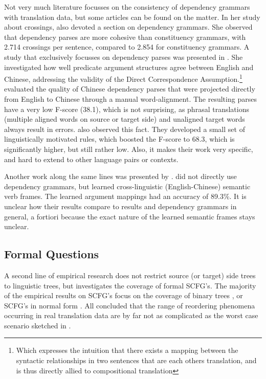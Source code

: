 Not very much literature focusses on the consistency of dependency grammars with translation data, but some articles can be found on the matter. In her study about crossings, \citeauthor{fox2002phrasal} also devoted a section on dependency grammars. She observed that dependency parses are more cohesive than constituency grammars, with
2.714 crossings per sentence, compared to 2.854 for constituency grammars. A study that exclusively focusses on dependency parses was presented in \cite{hwa2002evaluating}. She investigated how well predicate argument structures agree between English and Chinese, addressing the validity of the Direct Correspondence Assumption.\footnote{Which expresses the intuition that there exists a mapping between the syntactic relationships in two sentences that are each others translation, and is thus directly allied to compositional translation} \citeauthor{hwa2002evaluating} evaluated the quality of Chinese dependency parses that were projected directly from English to Chinese through a manual word-alignment. The resulting parses have a very low F-score (38.1), which is not surprising, as phrasal translations (multiple aligned words on source or target side) and unaligned target words always result in errors. \citeauthor{hwa2002evaluating} also observed this fact. They developed a small set of linguistically motivated rules, which boosted the F-score to 68.3, which is significantly higher, but still rather low. Also, it makes their work very specific, and hard to extend to other language pairs or contexts.

Another work along the same lines was presented by \cite{fung2006automatic}. \citeauthor{fung2006automatic} did not directly use dependency grammars, but learned cross-linguistic (English-Chinese) semantic verb frames. The learned argument mappings  had an accuracy of 89.3\%. It is unclear how their results compare to  results and dependency grammars in general, a fortiori because the exact nature of the learned semantic frames stays unclear.

\subsection{Formal Questions}

A second line of empirical research does not restrict source (or target) side trees to linguistic trees, but investigates the coverage of formal SCFG's. The majority of the empirical results on SCFG's focus on the coverage of binary trees \citep[e.g.,]{zhang2006synchronous,huang2009binarization}, or SCFG's in normal form \citep[e.g.,][]{sogaard2009empirical1,sogaard2009empirical2,sogaard2010can}. All concluded that the range of reordering phenomena occurring in real translation data are by far not as complicated as the worst case scenario sketched in \cite{satta2005some}.

